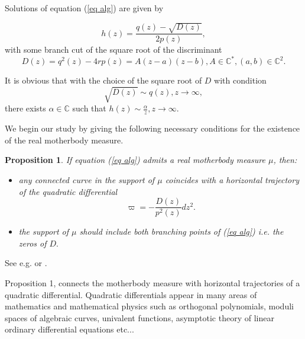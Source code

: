 \documentclass[12pt]{amsart}
\newtheorem{proposition}[theorem]{Proposition}
\begin{document}
Solutions of equation (\ref{eq alg}) are given by

\begin{equation*}
h\left( z\right) =\frac{q\left( z\right) -\sqrt{D\left( z\right) }}{2p\left(
z\right) },
\end{equation*}with some branch cut of the square root of the discriminant 
\begin{equation*}
D\left( z\right) =q^{2}\left( z\right) -4rp\left( z\right) =A\left(
z-a\right) \left( z-b\right) ,A\in 
\mathbb{C}
^{\ast },\left( a,b\right) \in 
\mathbb{C}
^{2}.
\end{equation*}

It is obvious that with the choice of the square root of $D$ with condition 
\begin{equation*}
\sqrt{D\left( z\right) }\sim q\left( z\right) ,z\rightarrow \infty ,
\end{equation*}there exists $\alpha \in 
\mathbb{C}
$ such that $h\left( z\right) \sim \displaystyle\frac{\alpha }{z},z\rightarrow \infty .$

We begin our study by giving the following necessary conditions for the
existence of the real motherbody measure.

\begin{proposition}
If equation (\ref{eq alg}) admits a real motherbody measure $\mu $, then:

\begin{itemize}
\item any connected curve in the support of $\mu $ coincides with a
horizontal trajectory of the quadratic differential 
\begin{equation*}
\varpi =-\frac{D\left( z\right) }{p^{2}\left( z\right) }dz^{2}.
\end{equation*}

\item the support of $\mu $ should include both branching points of (\ref{eq
alg}) i.e. the zeros of $D.$
\end{itemize}
\end{proposition}

\proof
See e.g.\cite{shapiro} or \cite{pritsker}.
\endproof

\bigskip

Proposition 1, connects the motherbody measure with horizontal trajectories
of a quadratic differential. Quadratic differentials appear in many areas of
mathematics and mathematical physics such as orthogonal polynomials, moduli
spaces of algebraic curves, univalent functions, asymptotic theory of linear
ordinary differential equations etc...
\end{document}
